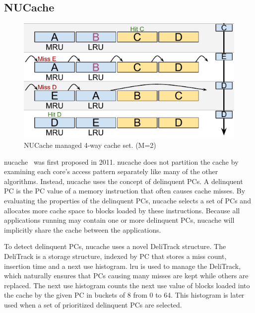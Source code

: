 
\subsection{NUCache}
\label{sec:algorithms:nucache}

\begin{figure}[ht]
    \centering
    \includegraphics[width=.65\textwidth]{figures/algorithms/NUCache}
    \caption[NUCache managed 4-way cache set.]{NUCache managed 4-way cache set. (M=2)}
    \label{fig:algorithms:nucache_example}
\end{figure}

\gls{nucache}~\cite{Manikantan2011} was first proposed in 2011.
\gls{nucache} does not partition the cache by examining each core's access pattern separately like many of the other algorithms. 
Instead, \gls{nucache} uses the concept of delinquent PCs.
A delinquent PC is the PC value of a memory instruction that often causes cache misses.
By evaluating the properties of the delinquent PCs, \gls{nucache} selects a set of PCs and allocates more cache space to blocks loaded by these instructions.
Because all applications running may contain one or more delinquent PCs, \gls{nucache} will implicitly share the cache between the applications.

To detect delinquent PCs, \gls{nucache} uses a novel DeliTrack structure.
The DeliTrack is a storage structure, indexed by PC that stores a miss count, insertion time and a next use histogram. 
\gls{lru} is used to manage the DeliTrack, which naturally ensures that PCs causing many misses are kept while others are replaced.
The next use histogram counts the next use value of blocks loaded into the cache by the given PC in buckets of 8 from 0 to 64.
This histogram is later used when a set of prioritized delinquent PCs are selected.

